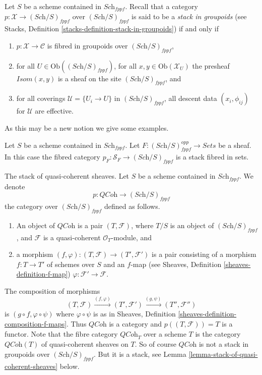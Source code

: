 \noindent
Let $S$ be a scheme contained in $\textit{Sch}_{fppf}$.
Recall that a category $p : \mathcal{X} \to (\textit{Sch}/S)_{fppf}$
over $(\textit{Sch}/S)_{fppf}$ is said to be a
{\it stack in groupoids} (see
Stacks, Definition \ref{stacks-definition-stack-in-groupoids})
if and only if
\begin{enumerate}
\item $p : \mathcal{X} \to \mathcal{C}$ is fibred
in groupoids over $(\textit{Sch}/S)_{fppf}$,
\item for all $U \in \text{Ob}((\textit{Sch}/S)_{fppf})$,
for all $x, y\in \text{Ob}(\mathcal{X}_U)$ the presheaf
$\mathit{Isom}(x, y)$ is a sheaf on the site $(\textit{Sch}/S)_{fppf}$, and
\item for all coverings $\mathcal{U} = \{U_i \to U\}$ in
$(\textit{Sch}/S)_{fppf}$, all descent data $(x_i, \phi_{ij})$
for $\mathcal{U}$ are effective.
\end{enumerate}
As this may be a new notion we give some examples.

\begin{example}
\label{example-stack-associated-to-sheaf}
Let $S$ be a scheme contained in $\textit{Sch}_{fppf}$.
Let $F : (\textit{Sch}/S)_{fppf}^{opp} \to \textit{Sets}$ be a sheaf.
In this case the fibred category
$p_F : \mathcal{S}_F \to (\textit{Sch}/S)_{fppf}$ 
is a stack fibred in sets.
\end{example}

\begin{example}
\label{example-stack-of-quasi-coherent-sheaves}
The stack of quasi-coherent sheaves.
Let $S$ be a scheme contained in $\textit{Sch}_{fppf}$.
We denote
$$
p : \textit{QCoh} \to (\textit{Sch}/S)_{fppf}
$$
the category over $(\textit{Sch}/S)_{fppf}$ defined as follows.
\begin{enumerate}
\item An object of $\textit{QCoh}$ is a pair $(T, \mathcal{F})$,
where $T/S$ is an object of $(\textit{Sch}/S)_{fppf}$, and $\mathcal{F}$
is a quasi-coherent $\mathcal{O}_T$-module, and
\item a morphism $(f, \varphi) : (T, \mathcal{F}) \to (T', \mathcal{F}')$
is a pair consisting of a morphism $f : T \to T'$ of schemes over $S$
and an $f$-map (see
Sheaves, Definition \ref{sheaves-definition-f-map})
$\varphi : \mathcal{F}' \to \mathcal{F}$.
\end{enumerate}
The composition of morphisms
$$
(T, \mathcal{F}) \xrightarrow{(f, \varphi)}
(T', \mathcal{F}') \xrightarrow{(g, \psi)} (T'', \mathcal{F}'')
$$
is $(g \circ f, \varphi \circ \psi)$ where $\varphi \circ \psi$ is
as in
Sheaves, Definition \ref{sheaves-definition-composition-f-maps}.
Thus $\textit{QCoh}$ is a category and $p((T, \mathcal{F})) = T$
is a functor. Note that the fibre category $\textit{QCoh}_T$ over
a scheme $T$ is the category $\textit{QCoh}(T)$ of quasi-coherent
sheaves on $T$. So of course $\textit{QCoh}$ is not a stack in
groupoids over $(\textit{Sch}/S)_{fppf}$. But it is a stack, see
Lemma \ref{lemma-stack-of-quasi-coherent-sheaves} below.
\end{example}

